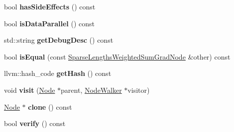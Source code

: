 \begin{DoxyCompactItemize}
\item 
\mbox{\label{classglow_1_1_sparse_lengths_weighted_sum_grad_node_a0eff567b20237f008a896b2f1296c13a}} 
bool {\bfseries has\+Side\+Effects} () const
\item 
\mbox{\label{classglow_1_1_sparse_lengths_weighted_sum_grad_node_aa5b3ec3393e945210f01208a63b5758b}} 
bool {\bfseries is\+Data\+Parallel} () const
\item 
\mbox{\label{classglow_1_1_sparse_lengths_weighted_sum_grad_node_a1ba323c00ccf0147d0f12cc25141b3ba}} 
std\+::string {\bfseries get\+Debug\+Desc} () const
\item 
\mbox{\label{classglow_1_1_sparse_lengths_weighted_sum_grad_node_ae43b0cde6bd906505d7dd970bbc7cc83}} 
bool {\bfseries is\+Equal} (const \hyperlink{classglow_1_1_sparse_lengths_weighted_sum_grad_node}{Sparse\+Lengths\+Weighted\+Sum\+Grad\+Node} \&other) const
\item 
\mbox{\label{classglow_1_1_sparse_lengths_weighted_sum_grad_node_a6fce9f4afc12b6fc4220be8be7ffffa4}} 
llvm\+::hash\+\_\+code {\bfseries get\+Hash} () const
\item 
\mbox{\label{classglow_1_1_sparse_lengths_weighted_sum_grad_node_a7940ccdd7a0f6c2d04ab7ff28a791382}} 
void {\bfseries visit} (\hyperlink{classglow_1_1_node}{Node} $\ast$parent, \hyperlink{classglow_1_1_node_walker}{Node\+Walker} $\ast$visitor)
\item 
\mbox{\label{classglow_1_1_sparse_lengths_weighted_sum_grad_node_a63c2d5f0a1f0b90873f38b0b0b111ba2}} 
\hyperlink{classglow_1_1_node}{Node} $\ast$ {\bfseries clone} () const
\item 
\mbox{\label{classglow_1_1_sparse_lengths_weighted_sum_grad_node_a18c5d3002c5f84005ecb18df639e4ca3}} 
bool {\bfseries verify} () const
\end{DoxyCompactItemize}
